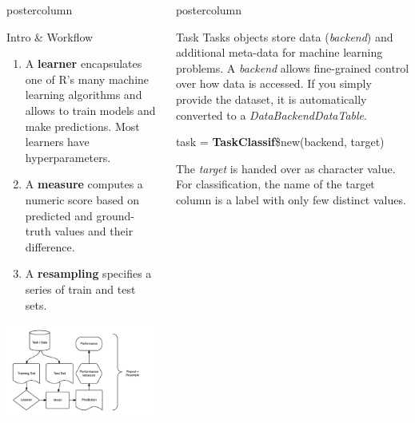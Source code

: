 \documentclass{beamer}
\newlength{\columnheight} %
\begin{document}
\begin{frame}[fragile]{}
\begin{columns}
\begin{column}{.245\textwidth}
\begin{beamercolorbox}[center]{postercolumn}
\begin{minipage}{.98\textwidth}
{\begin{myblock}{Intro \& Workflow}
\begin{enumerate}
								      what the prediction target is.
								\item A \textbf{learner} encapsulates one of R's many machine learning algorithms and allows to train models and make predictions. Most learners have hyperparameters.
								\item A \textbf{measure} computes a numeric score based on predicted and ground-truth values and their difference.
								\item A \textbf{resampling} specifies a series of train and test sets.
							\end{enumerate}
							\includegraphics[width=\textwidth]{img/ml_abstraction.png}
						\end{myblock}
					}
				\end{minipage}
			\end{beamercolorbox}
		\end{column}
		\begin{column}{.245\textwidth}
			\begin{beamercolorbox}[center]{postercolumn}
				\begin{minipage}{.98\textwidth}
					\parbox[t][\columnheight]{\textwidth}{
						\begin{myblock}{Task}
							Tasks objects store data (\textit{backend}) and additional meta-data for machine learning problems. A \textit{backend} allows fine-grained control over how data is accessed. If you simply provide the dataset, it is automatically converted to a \textit{DataBackendDataTable}.
							\\
							\begin{codebox}
								task = \textbf{TaskClassif}\$new(backend, target)
							\end{codebox}
							The \textit{target} is handed over as character value. For classification, the name of the target column is a label with only few distinct values.

\end{myblock}}
\end{minipage}
\end{beamercolorbox}
\end{column}
\end{columns}
\end{frame}
\end{document}
